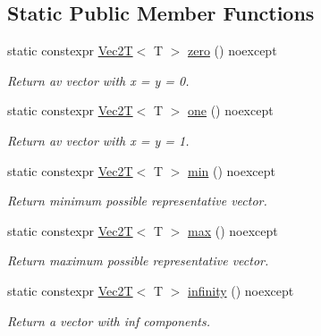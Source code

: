 \subsection*{Static Public Member Functions}
\begin{DoxyCompactItemize}
\item 
\mbox{\label{classVec2T_a3c243787a7817ce09946691cdf14d0e0}} 
static constexpr \hyperlink{classVec2T}{Vec2T}$<$ T $>$ \hyperlink{classVec2T_a3c243787a7817ce09946691cdf14d0e0}{zero} () noexcept
\begin{DoxyCompactList}\small\item\em Return av vector with x = y = 0. \end{DoxyCompactList}\item 
\mbox{\label{classVec2T_a9103ce94a3efa9e85cb732fb68af744e}} 
static constexpr \hyperlink{classVec2T}{Vec2T}$<$ T $>$ \hyperlink{classVec2T_a9103ce94a3efa9e85cb732fb68af744e}{one} () noexcept
\begin{DoxyCompactList}\small\item\em Return av vector with x = y = 1. \end{DoxyCompactList}\item 
\mbox{\label{classVec2T_aca5161a674a3546a8c9d5543537548a3}} 
static constexpr \hyperlink{classVec2T}{Vec2T}$<$ T $>$ \hyperlink{classVec2T_aca5161a674a3546a8c9d5543537548a3}{min} () noexcept
\begin{DoxyCompactList}\small\item\em Return minimum possible representative vector. \end{DoxyCompactList}\item 
\mbox{\label{classVec2T_a1211175344f9ee8bc0fd4ac2589799d8}} 
static constexpr \hyperlink{classVec2T}{Vec2T}$<$ T $>$ \hyperlink{classVec2T_a1211175344f9ee8bc0fd4ac2589799d8}{max} () noexcept
\begin{DoxyCompactList}\small\item\em Return maximum possible representative vector. \end{DoxyCompactList}\item 
\mbox{\label{classVec2T_a28b453ff4fd4ede74e401454b67f73d6}} 
static constexpr \hyperlink{classVec2T}{Vec2T}$<$ T $>$ \hyperlink{classVec2T_a28b453ff4fd4ede74e401454b67f73d6}{infinity} () noexcept
\begin{DoxyCompactList}\small\item\em Return a vector with inf components. \end{DoxyCompactList}\end{DoxyCompactItemize}
